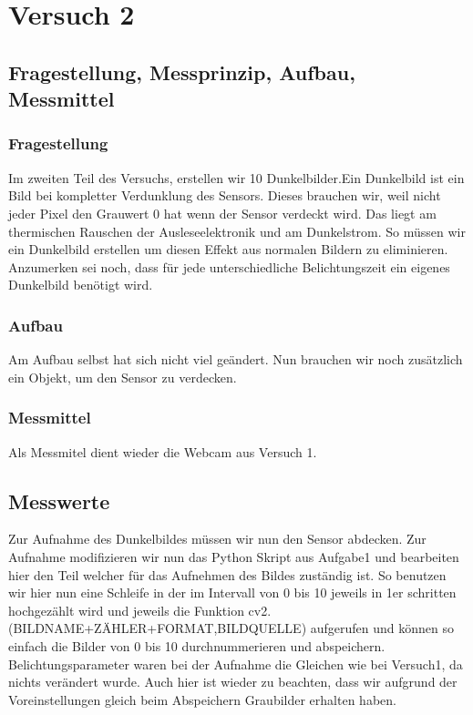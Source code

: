 \documentclass[TGAI_Laborbericht.tex]{subfiles}
\begin{document}
\chapter{Versuch 2}
\label{chap:VERSUCH_2}


\section{Fragestellung, Messprinzip, Aufbau, Messmittel}
\label{chap:VERSUCH_2_FRAGESTELLUNG}
\subsection{Fragestellung}

Im zweiten Teil des Versuchs, erstellen wir 10 Dunkelbilder.Ein Dunkelbild ist ein Bild bei kompletter Verdunklung des Sensors. Dieses brauchen wir, weil nicht jeder Pixel den Grauwert 0 hat wenn der Sensor verdeckt wird. Das liegt am thermischen Rauschen der Ausleseelektronik und am Dunkelstrom. So müssen wir ein Dunkelbild erstellen um diesen Effekt aus normalen Bildern zu eliminieren. Anzumerken sei noch, dass für jede unterschiedliche Belichtungszeit ein eigenes Dunkelbild benötigt wird.


\subsection{Aufbau}

Am Aufbau selbst hat sich nicht viel geändert. Nun brauchen wir noch zusätzlich ein Objekt, um den Sensor zu verdecken.

\subsection{Messmittel}

Als Messmitel dient wieder die Webcam aus Versuch 1.

\section{Messwerte}
\label{chap:VERSUCH_2_MESSWERTE}
Zur Aufnahme des Dunkelbildes müssen wir nun den Sensor abdecken. Zur Aufnahme modifizieren wir nun das Python Skript aus Aufgabe1 und bearbeiten hier den Teil welcher für das Aufnehmen des Bildes zuständig ist. So benutzen wir hier nun eine Schleife in der im Intervall von 0 bis 10 jeweils in 1er schritten hochgezählt wird und jeweils die Funktion cv2.(BILDNAME+ZÄHLER+FORMAT,BILDQUELLE) aufgerufen und können so einfach die Bilder von 0 bis 10 durchnummerieren und abspeichern. Belichtungsparameter waren bei der Aufnahme die Gleichen wie bei Versuch1, da nichts verändert wurde. Auch hier ist wieder zu beachten, dass wir aufgrund der Voreinstellungen gleich beim Abspeichern Graubilder erhalten haben.
\end{document}
